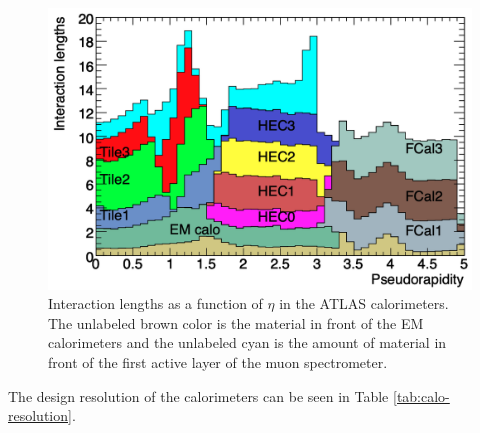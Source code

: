 	\begin{figure}[!ht]
	\centering
	\includegraphics[width=.65\textwidth,keepaspectratio=true]{chapters/chapter2_experiment/images/Calo_Interaction_Lengths.png}
	\caption{ Interaction lengths as a function of $\eta$ in the ATLAS calorimeters. The unlabeled brown color is the material in front of the EM calorimeters and the unlabeled cyan is the amount of material in front of the first active layer of the muon spectrometer. \cite{atlas-experiment}}
	\label{fig:calo-interaction-length}
	\end{figure}

	The design resolution of the calorimeters can be seen in Table \ref{tab:calo-resolution}.

	\begin{table}[!thp]
	\centering
	\caption{ Design resolution of EM and hadronic calorimeters in the ATLAS Detector.}
	\label{tab:calo-resolution}
	\end{table}


